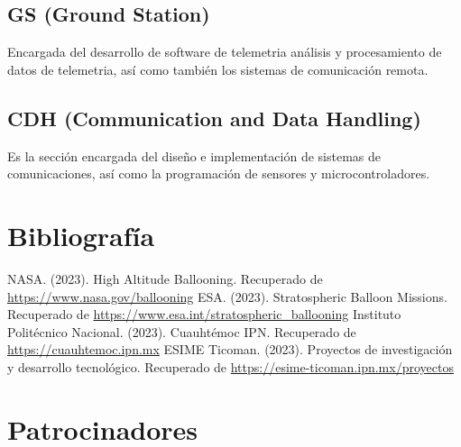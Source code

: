 \documentclass[letterpaper,12pt]{article} %
\begin{document}
    \subsection*{GS (Ground Station)}

    Encargada del desarrollo de software de telemetria análisis y procesamiento de datos de telemetria, así como también los sistemas de comunicación remota.
    
    \subsection*{CDH (Communication and Data Handling)}

    Es la sección encargada del diseño e implementación de sistemas de comunicaciones, así como la programación de sensores y microcontroladores.

    \newpage

\section{Bibliografía}
    \begin{thebibliography}{9}
         NASA. (2023). High Altitude Ballooning. Recuperado de \url{https://www.nasa.gov/ballooning}
         ESA. (2023). Stratospheric Balloon Missions. Recuperado de \url{https://www.esa.int/stratospheric_ballooning}
         Instituto Politécnico Nacional. (2023). Cuauhtémoc IPN. Recuperado de \url{https://cuauhtemoc.ipn.mx}
         ESIME Ticoman. (2023). Proyectos de investigación y desarrollo tecnológico. Recuperado de \url{https://esime-ticoman.ipn.mx/proyectos}

    \end{thebibliography}

    \newpage

    \section{Patrocinadores}
    \captionsetup[subfigure]{labelformat=empty}
\end{document}
